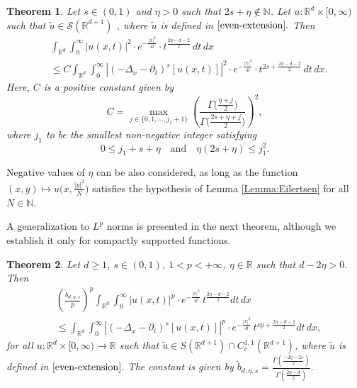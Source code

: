 \documentclass[11pt, twoside, notitlepage]{amsart}
\newtheorem{theorem}{Theorem}[section]
\newcommand\R{\mathbb{R}}
\numberwithin{equation}{section}
\begin{document}
\begin{theorem}\label{main:thm} Let $s  \in (0,1)$  and $\eta >0$ such that $ 2s+\eta\not\in \mathbb{N}$.
Let $u : \R^d \times [0,\infty)$ such that $\tilde{u} \in \mathcal{S}(\R^{d+1})$ ,  where $\tilde{u}$  is defined in $\eqref{even-extension}.$
Then
\begin{align}\label{Carleman}
	&\int_{\R^{d}}\int_0^\infty |u(x,t )|^2 \cdot e ^{-\frac{|x|^2}{4t}}  \cdot   t^{\frac{  2\eta-d -2 }{2}} \, dt\,  dx \\ \nonumber
	&\le  C\int_{\R^{d}}\int_0^\infty  \left| ( -\Delta_x-\partial_t)^{s} [u(x,t)]  \right|^2  \cdot e ^{-\frac{|x|^2}{4t}}  \cdot t^{ 2s + \frac{2\eta -d-2}{2}} \, dt \, dx.
\end{align}
Here, $C$ is a positive constant given by $$
C = \max_{j \in \{ 0,1,\dots, j_1+1 \}} \left(  \frac{ \Gamma\big( \frac{\eta+j}{2} \big)   }
{ \Gamma\big( \frac{2s+\eta+j}{2} \big)} \right)^2,$$
where $j_1$ to be the smallest non-negative integer satisfying
$$0\le j_1 + s + \eta  \quad  \text{and}  \quad    \eta(2s+\eta) \le   j_1^2  . $$
\end{theorem}
Negative values of $\eta$ can be also considered, as long as the function $(x,y)\mapsto u\big(x,\frac{|y|^2}{N}\big)$ satisfies the hypothesis of Lemma \ref{Lemma:Eilertsen} for all $N\in \mathbb{N}$.

A generalization to $L^p$ norms is presented in the next theorem, although we establish it only for compactly supported functions.




\begin{theorem}\label{Thm:CarlemanLp}
Let $d\ge 1$, $s\in (0,1)$,  $1<p<+\infty$, $\eta  \in \R$ such that $d-2\eta>0$. Then
    \begin{align}\label{Carleman-Lp}
&  \left(\frac{\tilde{b}_{d,\eta,s}}{p}\right)^p \int_{\R^{d}}\int_0^\infty |u(x,t )|^p   \cdot e ^{-\frac{|x|^2}{4t}}  \,   t^{\frac{  2\eta-d -2 }{2}}  dt \, dx \\
\nonumber &\le   \int_{\R^{d}}\int_0^\infty  \left| ( -\Delta_x-\partial_t)^{s} [u(x,t)]  \right|^p  \cdot e ^{-\frac{|x|^2}{4t}} \,  t^{ sp + \frac{2\eta -d-2}{2}} dt\, dx,
\end{align}
for all $u : \R^d \times[0,\infty) \to \R$ such that $ \tilde{u} \in S(\R^{d+1})   \cap C^{1,1}_c (\R^{d+1})$, where $\tilde{u}$  is defined in $\eqref{even-extension}.$ The constant is given by $\tilde{b}_{d,\eta,s}=\frac{
  \Gamma\left(  \frac{ - 2\eta-2s}{2} \right)
  }
  {
   \Gamma \left(\frac{2\eta-d}{2} \right)
   } $.
\end{theorem}
\end{document}
